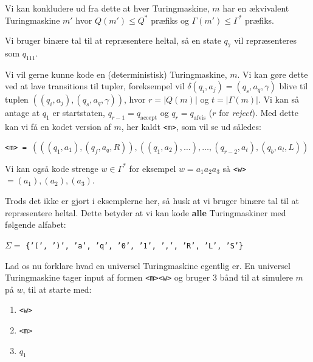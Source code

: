 Vi kan konkludere ud fra dette at hver Turingmaskine, $m$ har en ækvivalent Turingmaskine $m'$ hvor $Q(m') \le Q^{*}$ præfiks og $\Gamma(m') \le \Gamma^{*}$ præfiks.

Vi bruger binære tal til at repræsentere heltal, så en state $q_{7}$ vil repræsenteres som $q_{111}$.

Vi vil gerne kunne kode en (deterministisk) Turingmaskine, $m$. Vi kan gøre dette ved at lave transitions til tupler, foreksempel vil $\delta(q_{i}, a_{j}) = (q_{s}, a_{q}, \gamma)$ blive til tuplen $((q_{i}, a_{j}), (q_{s}, a_{q}, \gamma))$, hvor $r = |Q(m)|$ og $t = |\Gamma(m)|$. Vi kan så antage at $q_{1}$ er startstaten, $q_{r-1} = q_{\text{accept}}$  og $q_{r} = q_{\text{afvis}}$ ($r$ for \textit{reject}). Med dette kan vi få en kodet version af $m$, her kaldt \texttt{<m>}, som vil se ud således:

\begin{center}
\texttt{<m> = }$(((q_{1}, a_{1}), (q_{f}, a_{q}, R)), ((q_{1}, a_{2}), \ldots), \ldots, (q_{r-2}, a_{t}), (q_{b}, a_{l}, L))$
\end{center}

Vi kan også kode strenge $w \in \Gamma^{*}$ for eksempel $w = a_{1}a_{2}a_{3}$ så \texttt{<w>} $= (a_{1}),(a_{2}),(a_{3})$.

Trods det ikke er gjort i eksemplerne her, så husk at vi bruger binære tal til at repræsentere heltal. Dette betyder at vi kan kode \textbf{alle} Turingmaskiner med følgende alfabet:
\begin{center}
$\Sigma =$ \texttt{\{'(', ')', 'a', 'q', '0', '1', ',', 'R', 'L', 'S'\}}
\end{center}

Lad os nu forklare hvad en universel Turingmaskine egentlig er. En universel Turingmaskine tager input af formen \texttt{<m><w>} og bruger 3 bånd til at simulere $m$ på $w$, til at starte med:
\begin{enumerate}
  \item \texttt{<w>}
  \item \texttt{<m>}
  \item $q_{1}$
\end{enumerate}

